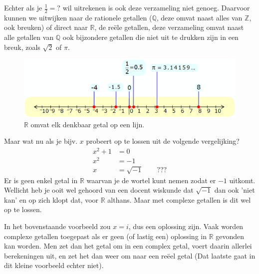 Echter als je $\frac{1}{2} = ?$ wil uitrekenen is ook deze verzameling niet genoeg. Daarvoor kunnen we uitwijken naar de rationele getallen ($\mathbb{Q}$, deze omvat naast alles van $\mathbb{Z}$, ook breuken) of direct naar $\mathbb{R}$, de reële getallen, deze verzameling omvat naast alle getallen van $\mathbb{Q}$ ook bijzondere getallen die niet uit te drukken zijn in een breuk, zoals $\sqrt{2}$ of $\pi$.

\begin{figure}[h!]
    \centering
    \includegraphics[scale=0.35]{pictures/figuren/line.png}
    \caption{$\mathbb{R}$ omvat elk denkbaar getal op een lijn.}
    \label{fig:lijnreeel}
\end{figure}

Maar wat nu als je bijv. $x$ probeert op te lossen uit de volgende vergelijking?
\begin{align*}
    x^2 + 1 &= 0 \\
    x^2 &= -1 \\
    x &= \sqrt{-1} \qquad ???
\end{align*}
Er is geen enkel getal in $\mathbb{R}$ waarvan je de wortel kunt nemen zodat er $-1$ uitkomt. Wellicht heb je ooit wel gehoord van een docent wiskunde dat $\sqrt{-1}$ dan ook 'niet kan' en op zich klopt dat, voor $\mathbb{R}$ althans. Maar met complexe getallen is dit wel op te lossen. 

In het bovenstaande voorbeeld zou $x=i$, dus een oplossing zijn. Vaak worden complexe getallen toegepast als er geen (of lastig een) oplossing in $\mathbb{R}$ gevonden kan worden. Men zet dan het getal om in een complex getal, voert daarin allerlei berekeningen uit, en zet het dan weer om naar een reëel getal (Dat laatste gaat in dit kleine voorbeeld echter niet). 


